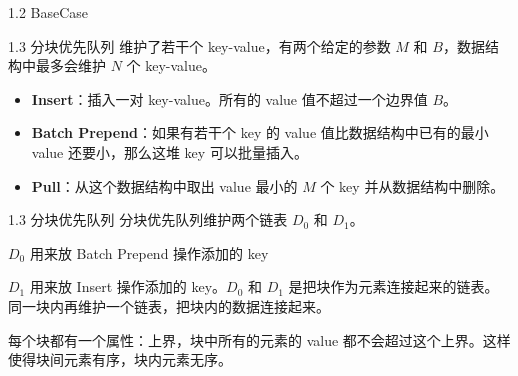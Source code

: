 \documentclass{beamer}
\begin{document}
\begin{frame}{1.2 BaseCase}
  \vspace*{-0.6\baselineskip}
  \centering
\end{frame}

\begin{frame}{1.3 分块优先队列}
  维护了若干个 key-value，有两个给定的参数 $M$ 和 $B$，数据结构中最多会维护 $N$ 个 key-value。

  \pause
  \begin{itemize}
    \item \textbf{Insert}：插入一对 key-value。所有的 value 值不超过一个边界值 $B$。
    \item \textbf{Batch Prepend}：如果有若干个 key 的 value 值比数据结构中已有的最小 value 还要小，那么这堆 key 可以批量插入。
    \item \textbf{Pull}：从这个数据结构中取出 value 最小的 $M$ 个 key 并从数据结构中删除。
  \end{itemize}
\end{frame}
\begin{frame}{1.3 分块优先队列}
  分块优先队列维护两个链表 $D_0$ 和 $D_1$。
  
  \pause
  
  $D_0$ 用来放 Batch Prepend 操作添加的 key
  
  \pause

  $D_1$ 用来放 Insert 操作添加的 key。$D_0$ 和 $D_1$ 是把块作为元素连接起来的链表。同一块内再维护一个链表，把块内的数据连接起来。

  \pause\vspace{0.35em}
  每个块都有一个属性：上界，块中所有的元素的 value 都不会超过这个上界。这样使得块间元素有序，块内元素无序。
\end{frame}
\end{document}

